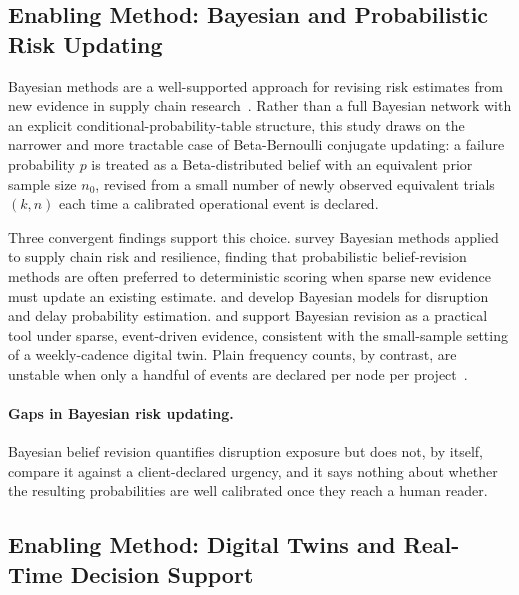 \subsection{Enabling Method: Bayesian and Probabilistic Risk Updating}
\label{sec:lit_bayes}

Bayesian methods are a well-supported approach for revising risk estimates from new
evidence in supply chain
research~\autocite{pearl1988probabilistic,koller2009probabilistic}. Rather than a full
Bayesian network with an explicit conditional-probability-table structure, this study draws
on the narrower and more tractable case of Beta-Bernoulli conjugate updating: a failure
probability $p$ is treated as a Beta-distributed belief with an equivalent prior sample
size $n_0$, revised from a small number of newly observed equivalent trials $(k, n)$ each
time a calibrated operational event is declared.

Three convergent findings support this choice. \textcite{hosseini2020bayesian} survey Bayesian methods applied to supply chain risk
and resilience, finding that probabilistic belief-revision methods are often preferred to
deterministic scoring when sparse new evidence must update an existing estimate. \textcite{huang2020bayesian} and \textcite{deng2020prediction}
develop Bayesian models for disruption and delay probability estimation.
\textcite{lockamy2011bayesian} and \textcite{qazi2017dynamic} support
Bayesian revision as a practical tool under sparse, event-driven evidence, consistent with
the small-sample setting of a weekly-cadence digital twin. Plain frequency counts, by
contrast, are unstable when only a handful of events are declared per node per
project~\autocite{zheng2020risk}.

\paragraph{Gaps in Bayesian risk updating.}
Bayesian belief revision quantifies disruption exposure but does not, by itself, compare it
against a client-declared urgency, and it says nothing about whether the resulting
probabilities are well calibrated once they reach a human reader.

\subsection{Enabling Method: Digital Twins and Real-Time Decision Support}
\label{sec:lit_dt}

